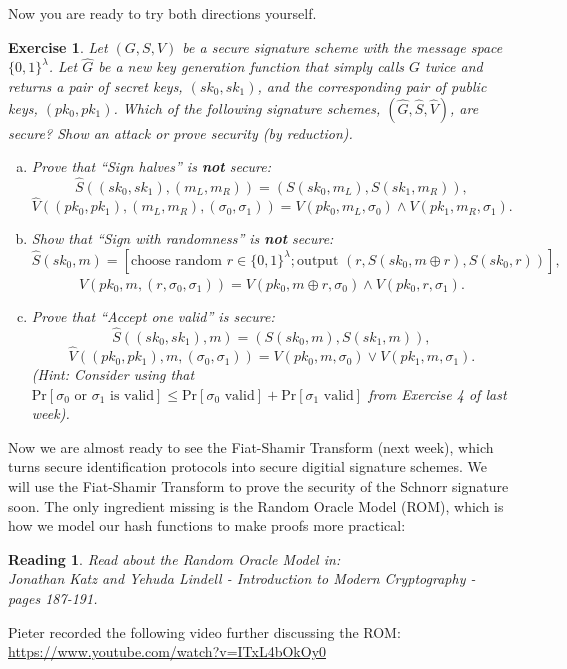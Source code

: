 \documentclass[12pt]{article}
\newcommand{\pr}[1]{\text{Pr}\left[#1\right]}
\newtheorem{exercise}{Exercise}
\newtheorem{reading}{Reading}
\theoremstyle{definition}
\theoremstyle{remark}
\theoremstyle{definition}
\begin{document}
Now you are ready to try both directions yourself.

\begin{exercise}
Let $(G, S, V)$ be a secure signature scheme with the message space $\{0,1\}^\lambda$. Let $\hat{G}$ be a new key generation function that simply calls $G$ twice and returns a pair of secret keys, $(sk_0, sk_1)$, and the corresponding pair of public keys, $(pk_0, pk_1)$. Which of the following signature schemes, $(\hat{G}, \hat{S}, \hat{V})$, are secure? Show an attack or prove security (by reduction).
\begin{enumerate}[(a)]
\item Prove that ``Sign halves'' is \textbf{not} secure: $$\hat{S}((sk_0, sk_1), (m_L, m_R)) = (S(sk_0, m_L), S(sk_1, m_R)),$$ $$\hat{V}((pk_0, pk_1), (m_L, m_R), (\sigma_0, \sigma_1)) = V(pk_0, m_L, \sigma_0)\wedge V(pk_1, m_R, \sigma_1).$$
\item Show that ``Sign with randomness'' is \textbf{not} secure: $$\hat{S}(sk_0, m) = [\text{choose random }r\in\{0,1\}^\lambda; \text{output }(r, S(sk_0, m\oplus r), S(sk_0, r))],$$ $$\hat{V}(pk_0, m, (r, \sigma_0, \sigma_1)) = V(pk_0, m\oplus r, \sigma_0)\wedge V(pk_0, r, \sigma_1).$$
\item Prove that ``Accept one valid'' is secure: $$\hat{S}((sk_0, sk_1), m) = (S(sk_0, m), S(sk_1, m)),$$ $$\hat{V}((pk_0, pk_1), m, (\sigma_0, \sigma_1)) = V(pk_0, m, \sigma_0)\vee V(pk_1, m, \sigma_1).$$ (Hint: Consider using that $\pr{\sigma_0\text{ or }\sigma_1\text{ is valid}} \leq \pr{\sigma_0\text{ valid}} + \pr{\sigma_1\text{ valid}}$ from Exercise 4 of last week).
\end{enumerate}
\end{exercise}

Now we are almost ready to see the Fiat-Shamir Transform (next week), which turns secure identification protocols into secure digitial signature schemes. We will use the Fiat-Shamir Transform to prove the security of the Schnorr signature soon. The only ingredient missing is the Random Oracle Model (ROM), which is how we model our hash functions to make proofs more practical:

\begin{reading}
Read about the Random Oracle Model in:\\
Jonathan Katz and Yehuda Lindell - Introduction to Modern Cryptography - pages 187-191.
\end{reading}

Pieter recorded the following video further discussing the ROM: \url{https://www.youtube.com/watch?v=ITxL4bOkOy0}\\
\end{document}
